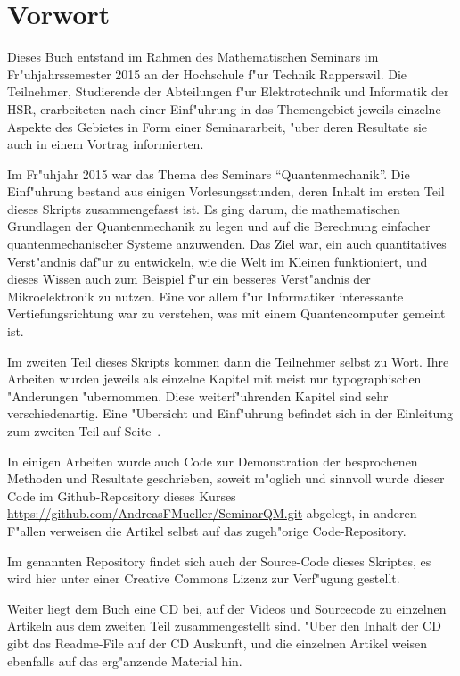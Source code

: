 \chapter*{Vorwort}
\rhead{}
Dieses Buch entstand im Rahmen des Mathematischen Seminars
im Fr"uhjahrssemester 2015 an der Hochschule f"ur Technik Rapperswil.
Die Teilnehmer, Studierende der Abteilungen f"ur Elektrotechnik und
Informatik der
HSR, erarbeiteten nach einer Einf"uhrung in das Themengebiet jeweils
einzelne Aspekte des Gebietes in Form einer Seminararbeit, "uber
deren Resultate sie auch in einem Vortrag informierten. 

Im Fr"uhjahr 2015 war das Thema des Seminars ``Quantenmechanik''.
Die Einf"uhrung bestand aus einigen Vorlesungsstunden, deren
Inhalt im ersten Teil dieses Skripts zusammengefasst ist.
Es ging darum, die mathematischen Grundlagen der Quantenmechanik zu
legen und auf die Berechnung einfacher quantenmechanischer 
Systeme anzuwenden. Das Ziel war, ein auch quantitatives Verst"andnis
daf"ur zu entwickeln, wie die Welt im Kleinen funktioniert, und 
dieses Wissen auch zum Beispiel f"ur ein besseres Verst"andnis der
Mikroelektronik zu nutzen. Eine vor allem f"ur Informatiker interessante
Vertiefungsrichtung war zu verstehen, was mit einem Quantencomputer
gemeint ist.

Im zweiten Teil dieses Skripts kommen dann die Teilnehmer
selbst zu Wort. Ihre Arbeiten wurden jeweils als einzelne
Kapitel mit meist nur typographischen "Anderungen "ubernommen.
Diese weiterf"uhrenden Kapitel sind sehr verschiedenartig.
Eine "Ubersicht und Einf"uhrung befindet sich in der Einleitung
zum zweiten Teil auf Seite~\pageref{skript:uebersicht}.

In einigen Arbeiten wurde auch Code zur Demonstration der 
besprochenen Methoden und Resultate geschrieben, soweit
m"oglich und sinnvoll wurde dieser Code im Github-Repository
dieses Kurses \url{https://github.com/AndreasFMueller/SeminarQM.git}
abgelegt, in anderen F"allen verweisen die Artikel selbst auf
das zugeh"orige Code-Repository.

Im genannten Repository findet sich auch der Source-Code dieses
Skriptes, es wird hier unter einer Creative Commons Lizenz
zur Verf"ugung gestellt.

Weiter liegt dem Buch eine CD bei, auf der Videos und Sourcecode zu
einzelnen Artikeln aus dem zweiten Teil zusammengestellt sind.
"Uber den Inhalt der CD gibt das Readme-File auf der CD Auskunft,
und die einzelnen Artikel weisen ebenfalls auf das erg"anzende
Material hin.


